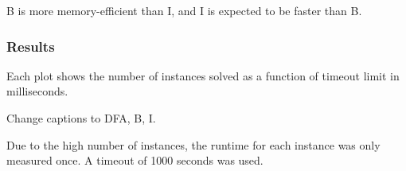 \documentclass[a4paper,11pt]{article}
\newcommand{\Todo}[1]{{\color{blue}#1}}
\newcommand{\CTpaper}[0]{DBLP:conf/cp/DemeulenaereHLP16}
\numberwithin{equation}{section}
\begin{document}
B is more memory-efficient than I, and I is expected to be faster than B.

\subsubsection{Results}
Each plot shows the number of instances solved as a function
of timeout limit in milliseconds.

\Todo{Change captions to DFA, B, I.}






Due to the high number of instances, the runtime for
each instance was only measured once. A timeout of 1000 seconds was used.

%









\end{document}
